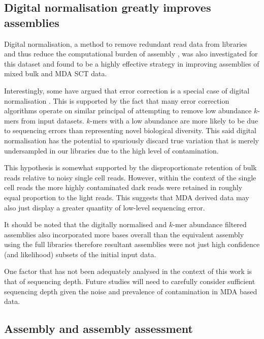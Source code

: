 \subsection{Digital normalisation greatly improves assemblies}

Digital normalisation, a method to remove redundant read data from libraries and thus
reduce the computational burden of assembly \citep{Brown2012}, was also investigated for this dataset
and found to be a highly effective strategy in improving assemblies of mixed bulk and MDA SCT data.

Interestingly, some have argued that error correction is a special case of digital normalisation
\citep{Krasileva2013}.  This is supported by the fact that many error correction
algorithms operate on similar principal of attempting to remove low abundance \(k\)-mers
from input datasets. \(k\)-mers with a low abundance
are more likely to be due to sequencing errors than representing novel biological
diversity.   
This said digital normalisation has the potential to
spuriously discard true variation that is merely undersampled in our libraries
due to the high level of contamination.  

This hypothesis is somewhat supported by the disproportionate 
retention of bulk reads relative to noisy single cell reads.  However,
within the context of the single cell reads the more highly
contaminated dark reads were retained in roughly equal proportion to the light reads.
This suggests that MDA derived data may also just display a greater quantity of 
low-level sequencing error.  

It should be noted that the digitally normalised and \(k\)-mer abundance filtered assemblies also
incorporated more bases overall than the equivalent assembly using the full
libraries therefore resultant assemblies were not just high confidence (and likelihood)
subsets of the initial input data.

One factor that has not been adequately analysed in the context of this work
is that of sequencing depth.  Future studies will need to carefully consider
sufficient sequencing depth given the noise and prevalence of contamination
in MDA based data.


\subsection{Assembly and assembly assessment}

